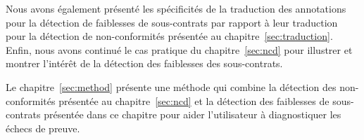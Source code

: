 Nous avons également présenté les spécificités de la traduction des annotations
pour la détection de faiblesses de sous-contrats par rapport à leur traduction
pour la détection de non-conformités présentée au chapitre~\ref{sec:traduction}.
Enfin, nous avons continué le cas pratique du chapitre~\ref{sec:ncd} pour
illustrer et montrer l'intérêt de la détection des faiblesses des sous-contrats.

Le chapitre~\ref{sec:method} présente une méthode qui combine la
détection des non-conformités présentée au chapitre~\ref{sec:ncd} et la
détection des faiblesses de sous-contrats présentée dans ce chapitre pour aider
l'utilisateur à diagnostiquer les échecs de preuve.
